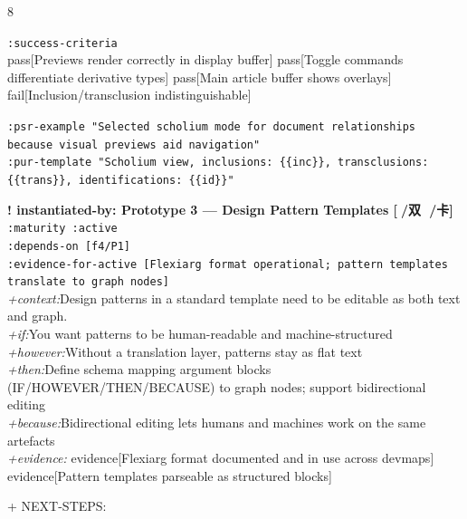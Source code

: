 \documentclass[landscape]{article}
\newcommand{\flexitag}[1]{\textcolor[gray]{0.35}{\textit{#1}}}
\newenvironment{devmapactive}{%
  \def\FrameCommand{\colorbox{devmapactivebg}}%
  \setlength{\fboxsep}{2pt}%
  \MakeFramed{\advance\hsize-\width \FrameRestore}%
}{\endMakeFramed}
\begin{document}
\begin{paracol}{8}
\begin{devmapactive}
\par
  \texttt{:\allowbreak{}success-\allowbreak{}criteria}\\
    pass[Previews render correctly in display buffer] pass[Toggle commands differentiate derivative types] pass[Main article buffer shows overlays] fail[Inclusion/transclusion indistinguishable]\\
\par
  \texttt{:\allowbreak{}psr-\allowbreak{}example "Selected scholium mode for document relationships because visual previews aid navigation"}\\
  \texttt{:\allowbreak{}pur-\allowbreak{}template "Scholium view,\allowbreak{} inclusions:\allowbreak{} \{\{inc\}\},\allowbreak{} transclusions:\allowbreak{} \{\{trans\}\},\allowbreak{} identifications:\allowbreak{} \{\{id\}\}"}\\
\par
\par
\end{devmapactive}
\begin{devmapactive}
\textbf{! instantiated-by: Prototype 3 — Design Pattern Templates [🙅/双 💬/卡]}\\
  \texttt{:\allowbreak{}maturity :\allowbreak{}active}\\
  \texttt{:\allowbreak{}depends-\allowbreak{}on [f4/\allowbreak{}P1]}\\
  \texttt{:\allowbreak{}evidence-\allowbreak{}for-\allowbreak{}active [Flexiarg format operational;\allowbreak{} pattern templates translate to graph nodes]}\\
  \flexitag{+context:}Design patterns in a standard template need to be editable as both text and graph.\\
  \flexitag{+if:}You want patterns to be human-readable and machine-structured\\
  \flexitag{+however:}Without a translation layer, patterns stay as flat text\\
  \flexitag{+then:}Define schema mapping argument blocks (IF/HOWEVER/THEN/BECAUSE) to graph nodes; support bidirectional editing\\
  \flexitag{+because:}Bidirectional editing lets humans and machines work on the same artefacts\\
  \flexitag{+evidence:} evidence[Flexiarg format documented and in use across devmaps] evidence[Pattern templates parseable as structured blocks]\\
\par
  + NEXT-STEPS:\\

\end{devmapactive}
\end{paracol}
\end{document}
